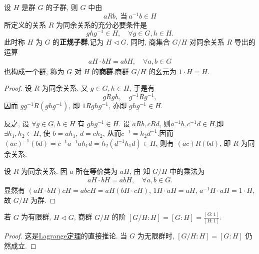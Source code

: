 \documentclass[../../main.tex]{subfiles}
\begin{document}
\begin{theorem}\label{theorem:抽象代数-定理 1.3.4}
设 \( H \) 是群 \( G \) 的子群, 则 \( G \) 中由
\[
a R b, \ \text{当} \ a^{-1}b \in H
\]
所定义的关系 \( R \) 为同余关系的充分必要条件是
\[
g h g^{-1} \in H, \quad \forall g \in G, h \in H.
\]
此时称 \( H \) 为 \( G \) 的\textbf{正规子群},记为 \( H \lhd  G \). 
同时, 商集合 \( G/H \) 对同余关系 \( R \) 导出的运算
\begin{align*}
aH \cdot bH = abH, \quad \forall a, b \in G
\end{align*}
也构成一个群, 称为 \( G \) 对 \( H \) 的\textbf{商群}.商群 \( G/H \) 的幺元为 \( 1 \cdot H = H \).
\end{theorem}
\begin{proof}
设 \( R \) 为同余关系. 又 \( g \in G, h \in H \), 于是有
\[
gRgh, \quad g^{-1}Rg^{-1},
\]
因而 \( gg^{-1}R(ghg^{-1}) \), 即 \( 1  R  ghg^{-1} \), 亦即 \( ghg^{-1} \in H \).

反之, 设 \( \forall g \in G, h \in H \) 有 \( ghg^{-1} \in H \). 设 \( a R b, c R d \), 则$a^{-1}b,c^{-1}d\in H$,即 \( \exists h_1, h_2 \in H \), 使 \( b = a h_1 \), \( d = c h_2 \), 从而$c^{-1}=h_2d^{-1}$.因而
\( (ac)^{-1}(bd)=c^{-1}a^{-1}ah_1d=h_2\left( d^{-1}h_1d \right) \in H\), 则有 \( (ac)  R  (bd) \), 即 \( R \) 为同余关系.

设 \( R \) 为同余关系. 因 \( a \) 所在等价类为 \( aH \), 由 知 \( G/H \) 中的乘法为
\begin{align}
aH \cdot bH = abH, \quad \forall a, b \in G. \label{eq:1.3.3}
\end{align}
显然有 \( (aH \cdot bH)cH = abcH = aH(bH \cdot cH) \), \( 1H \cdot aH = aH \), \( a^{-1}H \cdot aH = 1 \cdot H \), 故 \( G/H \) 为群.
\end{proof}

\begin{corollary}\label{corollary:抽象代数-推论 1.3.5}
若 \( G \) 为有限群, \( H \lhd  G \), 商群 \( G/H \) 的阶 \( [G/H : H] = [G : H] = \frac{[G:1]}{[H:1]} \).
\end{corollary}
\begin{proof}
这是\hyperref[theorem:抽象代数-Lagrange定理-定理 1.3.3]{Lagrange定理}的直接推论. 当 \( G \) 为无限群时, \( [G/H : H] = [G : H] \) 仍然成立.
\end{proof}
\textbf{} 
\end{document}
